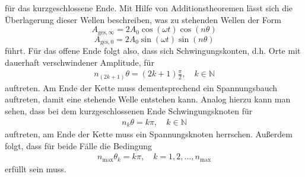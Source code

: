 für das kurzgeschlossene Ende.
Mit Hilfe von Additionstheoremen lässt sich die Überlagerung dieser Wellen beschreiben, was zu stehenden Wellen der Form
\begin{equation}
  \label{eqn:ste_1}
  A_{\text{ges}, \infty} = 2 A_0 \cos{(\omega t)} \cos{(n \theta)}
\end{equation}
\begin{equation}
    \label{eqn:ste_2}
  A_{\text{ges}, 0} = 2 A_0 \sin{(\omega t)} \sin{(n \theta)}
\end{equation}
führt.
Für das offene Ende folgt also, dass sich Schwingungskonten, d.h. Orte mit dauerhaft verschwindener Amplitude, für
\begin{align*}
  n_{(2k+1)} \theta = (2k+1) \frac{\pi}{2}, \quad k \in \mathbb{N}
\end{align*}
auftreten.
Am Ende der Kette muss dementsprechend ein Spannungsbauch auftreten, damit eine stehende Welle entstehen kann.
Analog hierzu kann man sehen, dass bei dem kurzgeschlossenen Ende Schwingungsknoten für
\begin{align*}
  n_{k} \theta = k \pi, \quad k \in \mathbb{N}
\end{align*}
auftreten, am Ende der Kette muss ein Spannungsknoten herrschen.
Außerdem folgt, dass für beide Fälle die Bedingung
\begin{align*}
  n_{\text{max}} \theta_k = k \pi, \quad k = 1, 2, \ldots, n_{\text{max}}
\end{align*}
erfüllt sein muss.
